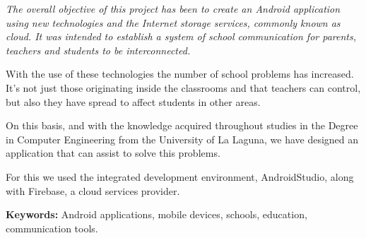 %
%
%
%

\newpage  %
\begin{summary}
	{\em
		The overall objective of this project has been to create an \textit{Android} application using new technologies and the Internet storage services, commonly known as cloud. It was intended to establish a system of school communication for parents, teachers and students to be interconnected.
		
		\bigskip
		With the use of these technologies the number of school problems has increased. It's not just those originating inside the classrooms and that teachers can control, but also they have spread to affect students in other areas.
		
		\bigskip
		On this basis, and with the knowledge acquired throughout studies in the Degree in Computer Engineering from the University of La Laguna, we have designed an application that can assist to solve this problems.
		
		\bigskip
		For this we used the integrated development environment, AndroidStudio, along with Firebase, a cloud services provider.
		
		\bigskip
		{\bf Keywords:} Android applications, mobile devices, schools, education, communication tools.
	}
\end{summary}

